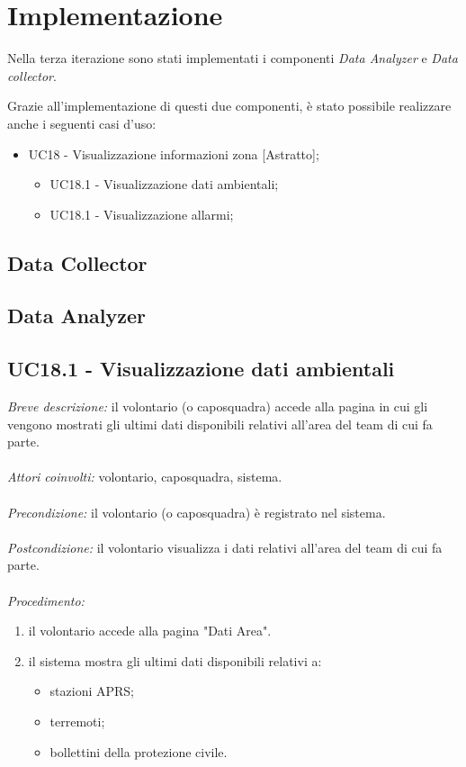 \section{Implementazione}
Nella terza iterazione sono stati implementati i componenti \textit{Data Analyzer} e \textit{Data collector}. 

Grazie all'implementazione di questi due componenti, è stato possibile realizzare anche i seguenti casi d'uso:
\begin{itemize}
	\item UC18 - Visualizzazione informazioni zona [Astratto];
	\begin{itemize}
		\item UC18.1 - Visualizzazione dati ambientali;
		\item UC18.1 - Visualizzazione allarmi;
	\end{itemize}
\end{itemize}


\subsection{Data Collector}


\subsection{Data Analyzer}

\subsection{UC18.1 - Visualizzazione dati ambientali}
\textit{Breve descrizione:} il volontario (o caposquadra) accede alla pagina in cui gli vengono mostrati gli ultimi dati disponibili relativi all'area del team di cui fa parte. 
\\
\\
\textit{Attori coinvolti:} volontario, caposquadra, sistema.
\\
\\
\textit{Precondizione:} il volontario (o caposquadra) è registrato nel sistema.
\\
\\
\textit{Postcondizione:} il volontario visualizza i dati relativi all'area del team di cui fa parte.
\\
\\
\textit{Procedimento:}
\begin{enumerate}
	\item il volontario accede alla pagina "Dati Area".
	\item il sistema mostra gli ultimi dati disponibili relativi a:
	\begin{itemize}
		\item stazioni APRS;
		\item terremoti;
		\item bollettini della protezione civile.
	\end{itemize}
\end{enumerate}

